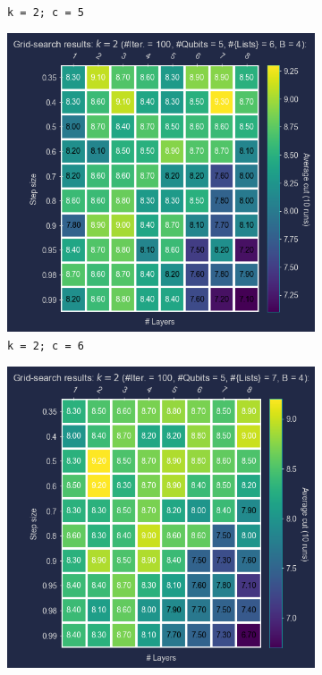 \begin{figure}[ht!]
\begin{subfigure}[b]{0.325\textwidth}
      \caption{\texttt{k = 2; c = 5}}
      \label{fig:k=2;c=5}
  \end{subfigure}
  \hfill
  \begin{subfigure}[b]{0.325\textwidth}
      \centering
      \includegraphics[width=1\textwidth]{Figures/Chapter_5/k=2(Grid_Search)/iQAQE_k2_Grid_Search_step_size_n_layers_c=6.png}
      \caption{\texttt{k = 2; c = 6}}
      \label{fig:k=2;c=6}
  \end{subfigure}
  \hfill
  \begin{subfigure}[b]{0.325\textwidth}
      \centering
      \includegraphics[width=1\textwidth]{Figures/Chapter_5/k=2(Grid_Search)/iQAQE_k2_Grid_Search_step_size_n_layers_c=7.png}

\end{subfigure}
\end{figure}
